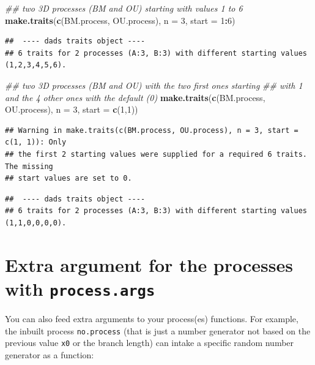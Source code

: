 \documentclass[]{book}
\newenvironment{Shaded}{\begin{snugshade}}{\end{snugshade}}
\newcommand{\CommentTok}[1]{\textcolor[rgb]{0.56,0.35,0.01}{\textit{#1}}}
\newcommand{\DataTypeTok}[1]{\textcolor[rgb]{0.13,0.29,0.53}{#1}}
\newcommand{\DecValTok}[1]{\textcolor[rgb]{0.00,0.00,0.81}{#1}}
\newcommand{\KeywordTok}[1]{\textcolor[rgb]{0.13,0.29,0.53}{\textbf{#1}}}
\newcommand{\NormalTok}[1]{#1}
\newcommand{\OperatorTok}[1]{\textcolor[rgb]{0.81,0.36,0.00}{\textbf{#1}}}
\begin{document}
\begin{Shaded}
\begin{Highlighting}[]
\CommentTok{## two 3D processes (BM and OU) starting with values 1 to 6}
\KeywordTok{make.traits}\NormalTok{(}\KeywordTok{c}\NormalTok{(BM.process, OU.process), }\DataTypeTok{n =} \DecValTok{3}\NormalTok{, }\DataTypeTok{start =} \DecValTok{1}\OperatorTok{:}\DecValTok{6}\NormalTok{)}
\end{Highlighting}
\end{Shaded}

\begin{verbatim}
##  ---- dads traits object ---- 
## 6 traits for 2 processes (A:3, B:3) with different starting values (1,2,3,4,5,6).
\end{verbatim}

\begin{Shaded}
\begin{Highlighting}[]
\CommentTok{## two 3D processes (BM and OU) with the two first ones starting}
\CommentTok{## with 1 and the 4 other ones with the default (0)}
\KeywordTok{make.traits}\NormalTok{(}\KeywordTok{c}\NormalTok{(BM.process, OU.process), }\DataTypeTok{n =} \DecValTok{3}\NormalTok{, }\DataTypeTok{start =} \KeywordTok{c}\NormalTok{(}\DecValTok{1}\NormalTok{,}\DecValTok{1}\NormalTok{))}
\end{Highlighting}
\end{Shaded}

\begin{verbatim}
## Warning in make.traits(c(BM.process, OU.process), n = 3, start = c(1, 1)): Only
## the first 2 starting values were supplied for a required 6 traits. The missing
## start values are set to 0.
\end{verbatim}

\begin{verbatim}
##  ---- dads traits object ---- 
## 6 traits for 2 processes (A:3, B:3) with different starting values (1,1,0,0,0,0).
\end{verbatim}

\hypertarget{extra-argument-for-the-processes-with-process.args}{%
\section{\texorpdfstring{Extra argument for the processes with \texttt{process.args}}{Extra argument for the processes with process.args}}\label{extra-argument-for-the-processes-with-process.args}}

You can also feed extra arguments to your process(es) functions. For example, the inbuilt process \texttt{no.process} (that is just a number generator not based on the previous value \texttt{x0} or the branch length) can intake a specific random number generator as a function:
\end{document}
